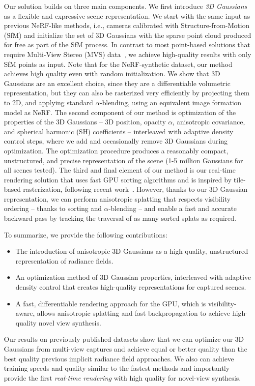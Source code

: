 Our solution builds on three main components.  We first introduce \emph{3D Gaussians} as a flexible and expressive scene representation.
We start with the same input as previous NeRF-like methods, i.e., cameras calibrated with Structure-from-Motion (SfM) \cite{snavely2006photo} and initialize the set of 3D Gaussians with the sparse point cloud produced for free as part of the SfM process. In contrast to most point-based solutions that require Multi-View Stereo (MVS) data~\cite{aliev20,kopanas21,ruckert22}, we achieve high-quality results with only SfM points as input. Note that for the NeRF-synthetic dataset, our method achieves high quality even with random initialization.
We show that 3D Gaussians are an excellent choice, since they are a differentiable volumetric representation, but they can also be rasterized very efficiently by projecting them to 2D, and applying standard $\alpha$-blending, using an equivalent image formation model as NeRF.
The second component of our method is optimization of the properties of the 3D Gaussians -- 3D position, opacity $\alpha$, anisotropic covariance, and spherical harmonic (SH) coefficients -- interleaved with adaptive density control steps, where we add and occasionally remove 3D Gaussians during optimization. The optimization procedure produces a reasonably compact, unstructured, and precise representation of the scene (1-5 million Gaussians for all scenes tested).
The third and final element of our method is our real-time rendering solution that uses fast GPU sorting algorithms and is inspired by tile-based rasterization, following recent work~\cite{Lassner_2021_CVPR}. However, thanks to our 3D Gaussian representation, we can perform anisotropic splatting that respects visibility ordering -- thanks to sorting and $\alpha$-blending -- and enable a fast and accurate backward pass by tracking the traversal of as many sorted splats as required.



\noindent
To summarize, we provide the following contributions:
\begin{itemize}
	\item The introduction of anisotropic 3D Gaussians as a high-quality, unstructured representation of radiance fields.
	\item An optimization method of 3D Gaussian properties, interleaved with adaptive density control that creates high-quality representations for captured scenes.
	\item A fast, differentiable rendering approach for the GPU, which is visibility-aware, allows anisotropic splatting and fast backpropagation to achieve high-quality novel view synthesis.
\end{itemize}

\noindent
Our results on previously published datasets show that we can optimize our 3D Gaussians from multi-view captures and achieve equal or better quality than the best quality previous implicit radiance field approaches. We also can achieve training speeds and quality similar to the fastest methods and importantly provide the first \emph{real-time rendering} with high quality for novel-view synthesis.

